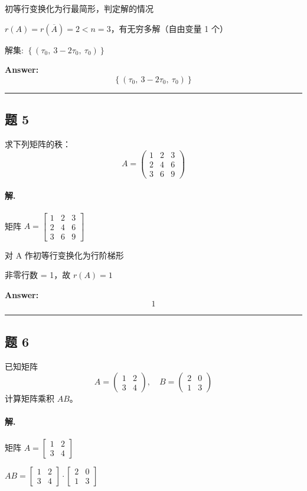 \documentclass[12pt, a4paper]{article}
\newcommand{\problem}[1]{\subsection*{题 #1}}
\newcommand{\solution}{\paragraph{解.}}
\begin{document}
初等行变换化为行最简形，判定解的情况

$r(A) = r(\overline{A}) = 2 < n = 3$，有无穷多解（自由变量 1 个）

解集: $\left\{\left( \tau_{0}, \  3 - 2 \tau_{0}, \  \tau_{0}\right)\right\}$

\textbf{Answer:}
\[\boxed{\left\{\left( \tau_{0}, \  3 - 2 \tau_{0}, \  \tau_{0}\right)\right\}}\]

\vspace{1em}
\hrule
\vspace{1em}

\problem{5}

求下列矩阵的秩：
$$A = \begin{pmatrix} 1 & 2 & 3 \\ 2 & 4 & 6 \\ 3 & 6 & 9 \end{pmatrix}$$

\solution

矩阵 $A = \left[\begin{matrix}1 & 2 & 3\\2 & 4 & 6\\3 & 6 & 9\end{matrix}\right]$

对 A 作初等行变换化为行阶梯形

非零行数 = 1，故 $r(A) = 1$

\textbf{Answer:}
\[\boxed{1}\]

\vspace{1em}
\hrule
\vspace{1em}

\problem{6}

已知矩阵
$$A = \begin{pmatrix} 1 & 2 \\ 3 & 4 \end{pmatrix} , \quad B = \begin{pmatrix} 2 & 0 \\ 1 & 3 \end{pmatrix}$$
计算矩阵乘积 $AB$。

\solution

矩阵 $A = \left[\begin{matrix}1 & 2\\3 & 4\end{matrix}\right]$

$AB = \left[\begin{matrix}1 & 2\\3 & 4\end{matrix}\right] \cdot \left[\begin{matrix}2 & 0\\1 & 3\end{matrix}\right]$
\end{document}
